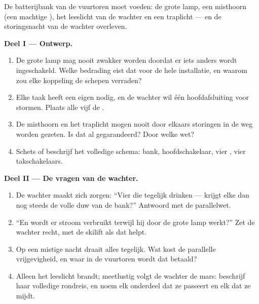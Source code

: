 \begin{problem}\label{pb:g7:circuits-series-parallel:1}
De batterijbank van de vuurtoren moet voeden: de grote lamp, een
misthoorn (een machtige ), het leeslicht van de wachter en
een traplicht --- en de storingsnacht van de wachter overleven.

\medskip\noindent\textbf{Deel I --- Ontwerp.}
\begin{enumerate}
  \item De grote lamp mag nooit zwakker worden doordat er iets
        anders wordt ingeschakeld. Welke bedrading eist dat voor de
        hele installatie, en waarom zou elke koppeling  de
        schepen verraden?
  \item Elke taak heeft een eigen  nodig, en de wachter
        wil één hoofdafsluiting voor stormen. Plaats alle vijf de
        .
  \item De misthoorn en het traplicht mogen nooit door elkaars
        storingen in de weg worden gezeten. Is dat al gegarandeerd?
        Door welke wet?
  \item Schets of beschrijf het volledige schema: bank,
        hoofdschakelaar, vier , vier
        takschakelaars.
\end{enumerate}

\medskip\noindent\textbf{Deel II --- De vragen van de wachter.}
\begin{enumerate}[resume]
  \item De wachter maakt zich zorgen: ``Vier  die tegelijk
        drinken --- krijgt elke  dan nog steeds de volle duw van
        de bank?'' Antwoord met de parallelwet.
  \item ``En wordt er stroom verbruikt terwijl hij door de grote lamp
        werkt?'' Zet de wachter recht, met de skilift als dat helpt.
  \item Op een mistige nacht draait alles tegelijk. Wat kost de
        parallelle vrijgevigheid, en waar in de vuurtoren wordt dat
        betaald?
  \item Alleen het leeslicht brandt; meetlustig volgt de wachter de
        mars: beschrijf haar volledige rondreis, en noem elk
        onderdeel dat ze passeert en elk dat ze mijdt.
\end{enumerate}


\end{problem}
